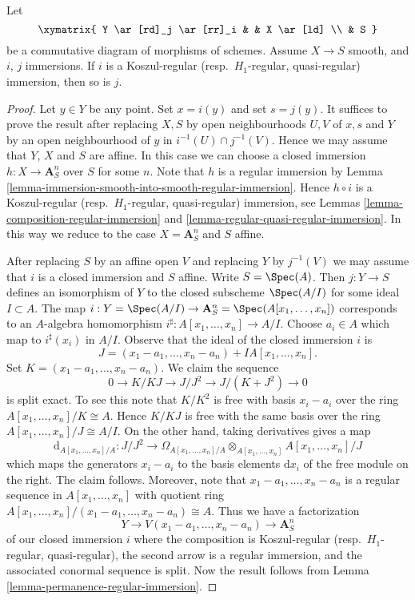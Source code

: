 \begin{lemma}
\label{lemma-push-regular-immersion-thru-smooth}
Let
$$
\xymatrix{
Y \ar[rd]_j \ar[rr]_i & & X \ar[ld] \\
& S
}
$$
be a commutative diagram of morphisms of schemes.
Assume $X \to S$ smooth, and $i$, $j$ immersions.
If $i$ is a Koszul-regular (resp.\ $H_1$-regular, quasi-regular)
immersion, then so is $j$.
\end{lemma}

\begin{proof}
Let $y \in Y$ be any point. Set $x = i(y)$ and set $s = j(y)$.
It suffices to prove the result after replacing $X, S$ by open
neighbourhoods $U, V$ of $x, s$ and $Y$ by an open neighbourhood
of $y$ in $i^{-1}(U) \cap j^{-1}(V)$. Hence we may assume that
$Y$, $X$ and $S$ are affine. In this case we can choose a closed
immersion $h : X \to \mathbf{A}^n_S$ over $S$ for some $n$. Note that
$h$ is a regular immersion by
Lemma \ref{lemma-immersion-smooth-into-smooth-regular-immersion}.
Hence $h \circ i$ is a Koszul-regular (resp.\ $H_1$-regular, quasi-regular)
immersion, see
Lemmas \ref{lemma-composition-regular-immersion} and
\ref{lemma-regular-quasi-regular-immersion}.
In this way we reduce to the case $X = \mathbf{A}^n_S$ and $S$ affine.

\medskip\noindent
After replacing $S$ by an affine open $V$ and replacing $Y$ by
$j^{-1}(V)$ we may assume that $i$ is a closed immersion and $S$
affine. Write $S = \Spec(A)$. Then $j : Y \to S$ defines an
isomorphism of $Y$ to the closed subscheme $\Spec(A/I)$ for
some ideal $I \subset A$. The map
$i : Y = \Spec(A/I) \to
\mathbf{A}^n_S = \Spec(A[x_1, \ldots, x_n])$
corresponds to an $A$-algebra homomorphism
$i^\sharp : A[x_1, \ldots, x_n] \to A/I$.
Choose $a_i \in A$ which map to $i^\sharp(x_i)$ in $A/I$.
Observe that the ideal of the closed immersion $i$ is
$$
J = (x_1 - a_1, \ldots, x_n - a_n) + IA[x_1, \ldots, x_n].
$$
Set $K = (x_1 - a_1, \ldots, x_n - a_n)$. We claim the sequence
$$
0 \to K/KJ \to J/J^2 \to J/(K + J^2) \to 0
$$
is split exact. To see this note that $K/K^2$ is free with basis
$x_i - a_i$ over the ring $A[x_1, \ldots, x_n]/K \cong A$.
Hence $K/KJ$ is free with the same basis over the ring
$A[x_1, \ldots, x_n]/J \cong A/I$. On the other hand, taking derivatives
gives a map
$$
\text{d}_{A[x_1, \ldots, x_n]/A} :
J/J^2
\longrightarrow
\Omega_{A[x_1, \ldots, x_n]/A} \otimes_{A[x_1, \ldots, x_n]}
A[x_1, \ldots, x_n]/J
$$
which maps the generators $x_i - a_i$ to the basis elements $\text{d}x_i$
of the free module on the right. The claim follows. Moreover, note that
$x_1 - a_1, \ldots, x_n - a_n$ is a regular sequence in
$A[x_1, \ldots, x_n]$ with quotient ring
$A[x_1, \ldots, x_n]/(x_1 - a_1, \ldots, x_n - a_n) \cong A$.
Thus we have a factorization
$$
Y \to V(x_1 - a_1, \ldots, x_n - a_n) \to \mathbf{A}^n_S
$$
of our closed immersion $i$ where the composition is
Koszul-regular (resp.\ $H_1$-regular, quasi-regular),
the second arrow is a regular immersion, and the associated conormal
sequence is split. Now the result follows from
Lemma \ref{lemma-permanence-regular-immersion}.
\end{proof}

